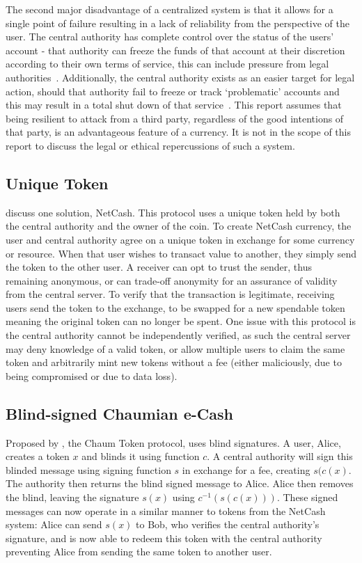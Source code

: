 The second major disadvantage of a centralized system is that it allows  for  a single point of failure resulting in a lack of reliability from   the  perspective of the user.  The central authority has complete  control over the status of the users' account - that authority can   freeze the funds of that account at their discretion according to their  own terms of service, this can include pressure from legal  authorities~\cite{mtgox-dwolla,vlad:mtgox-dwolla,wikileaks-paypal}.   Additionally, the central authority exists as an easier target for  legal  action, should that authority fail to freeze or track  `problematic'  accounts and this may result in a total shut down of  that  service~\cite{lr-shutdown,egold-shutdown,lr-idictment}. This  report assumes that being resilient  to attack from a third party, regardless of the good intentions of that  party, is an advantageous feature of a  currency.  It is not in the  scope of this report to discuss the legal or ethical repercussions of  such a system.

\subsection{Unique Token}
\textcite{netcash} discuss one solution, NetCash.  This protocol uses a unique token held by both the central authority and the owner of the coin. To create NetCash currency, the user and central authority agree on a unique token in exchange for some currency or resource. When that user wishes to transact value to another, they simply send the token to the other user.  A receiver can opt to trust the sender, thus remaining anonymous, or can trade-off anonymity for an assurance of validity from the central server.  To verify that the transaction is legitimate, receiving users send the token to the exchange, to be swapped for a new spendable token meaning the original token can no longer be spent. One issue with this protocol is the central authority cannot be independently verified, as such the central server may deny knowledge of a valid token, or allow multiple users to claim the same token and arbitrarily mint new tokens without a fee (either maliciously, due to being compromised or due to data loss).

\subsection{Blind-signed Chaumian e-Cash}
Proposed by \textcite{chaum}, the Chaum Token protocol, uses blind signatures. A user, Alice, creates a token $x$ and blinds it using function $c$.  A central authority will sign this blinded message using signing function $s$ in exchange for a fee, creating $s(c(x)$.  The authority then returns the blind signed message to Alice. Alice then removes the blind, leaving the signature $s(x)$ using $c^{-1}(s(c(x)))$.  These signed messages can now operate in a similar manner to tokens from the NetCash system: Alice can send $s(x)$ to Bob, who verifies the central authority's signature, and is now able to redeem this token with the central authority preventing Alice from sending the same token to another user.


